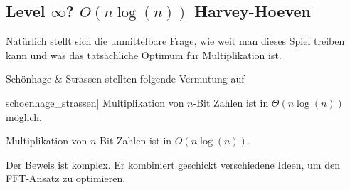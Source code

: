 
\subsection{Level \texorpdfstring{$\infty$}{infinity}? \texorpdfstring{$O(n\log(n))$}{O(n log(n))} Harvey-Hoeven}

\begin{remark}
    Natürlich stellt sich die unmittelbare Frage, wie weit man dieses Spiel treiben kann und was das tatsächliche Optimum für Multiplikation ist.

    Schönhage \& Strassen stellten folgende Vermutung auf
\end{remark}

\begin{conjecture}[Schönhage-Strassen \citep[283]{schoenhage_strassen}]
    Multiplikation von $n$-Bit Zahlen ist in $\Theta(n\log(n))$ möglich.
\end{conjecture}

\begin{theorem}
    Multiplikation von $n$-Bit Zahlen ist in $O(n\log(n))$.
\end{theorem}

\begin{remark}
    Der Beweis ist komplex. Er kombiniert geschickt verschiedene Ideen, um den FFT-Ansatz zu optimieren.
\end{remark}

